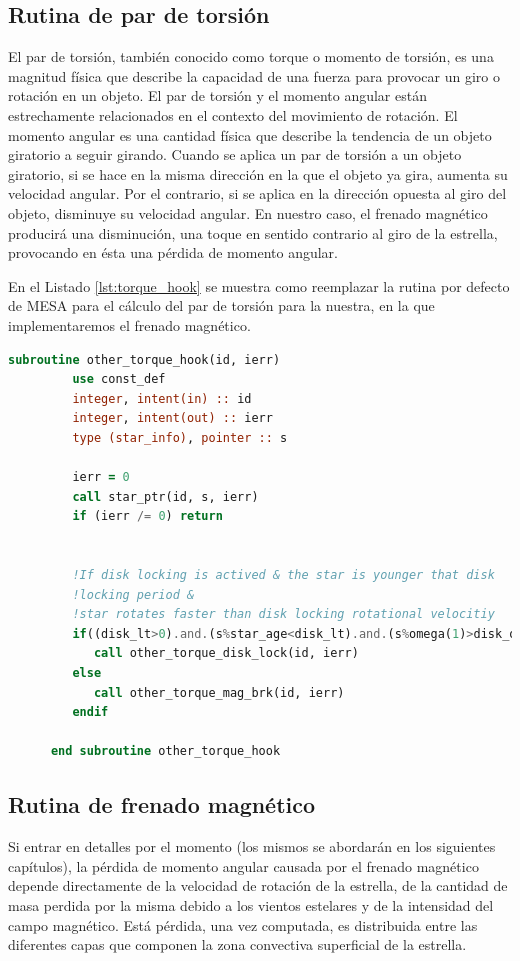 \subsection{Rutina de par de torsión}
El par de torsión, también conocido como torque o momento de torsión, es una magnitud física que describe la capacidad de una fuerza para provocar un giro o rotación en un objeto. El par de torsión y el momento angular están estrechamente relacionados en el contexto del movimiento de rotación. El momento angular es una cantidad física que describe la tendencia de un objeto giratorio a seguir girando. Cuando se aplica un par de torsión a un objeto giratorio, si se hace en la misma dirección en la que el objeto ya gira, aumenta su velocidad angular. Por el contrario, si se aplica en la dirección opuesta al giro del objeto, disminuye su velocidad angular. En nuestro caso, el frenado magnético producirá una disminución, una toque en sentido contrario al giro de la estrella, provocando en ésta una pérdida de momento angular.\par

En el Listado \ref{lst:torque_hook} se muestra como reemplazar la rutina por defecto de MESA para el cálculo del par de torsión para la nuestra, en la que implementaremos el frenado magnético. 
 
\begin{lstlisting}[language=Fortran, float, caption={Rutina de par de torsión.}, label={lst:torque_hook}]
      subroutine other_torque_hook(id, ierr)
         use const_def
         integer, intent(in) :: id
         integer, intent(out) :: ierr
         type (star_info), pointer :: s

         ierr = 0
         call star_ptr(id, s, ierr)
         if (ierr /= 0) return


         !If disk locking is actived & the star is younger that disk 
         !locking period &
         !star rotates faster than disk locking rotational velocitiy
         if((disk_lt>0).and.(s%star_age<disk_lt).and.(s%omega(1)>disk_omega)) then
            call other_torque_disk_lock(id, ierr)
         else
            call other_torque_mag_brk(id, ierr)
         endif
         
      end subroutine other_torque_hook
\end{lstlisting}

\subsection{Rutina de frenado magnético}
Si entrar en detalles por el momento (los mismos se abordarán en los siguientes capítulos), la pérdida de momento angular causada por el frenado magnético depende directamente de la velocidad de rotación de la estrella, de la cantidad de masa perdida por la misma debido a los vientos estelares y de la intensidad del campo magnético. Está pérdida, una vez computada, es distribuida entre las diferentes capas que componen la zona convectiva superficial de la estrella.\par

